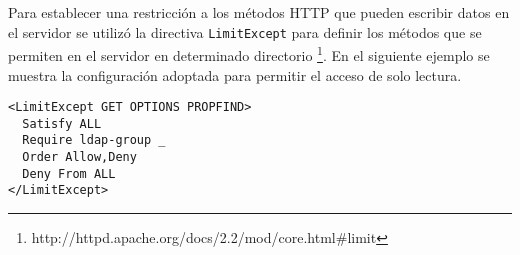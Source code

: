 {
 \linespread{1}
 \begin{table}[H]
 \caption{Clasificaci\'{o}n de m\'{e}todos \textsc{HTTP} de acuerdo al acceso a los datos}{}
 \label{tab:http-methods}
 \noindent{} %
 \end{table}
}

Para establecer una restricci\'{o}n a los m\'{e}todos \textsc{HTTP} que pueden escribir datos en el servidor se utiliz\'{o} la directiva \texttt{LimitExcept} para definir los m\'{e}todos que se permiten en el servidor en determinado directorio \footnote{http://httpd.apache.org/docs/2.2/mod/core.html\#limit}. En el siguiente ejemplo se muestra la configuraci\'{o}n adoptada para permitir el acceso de solo lectura.

{
\scriptsize
\linespread{1}
\begin{verbatim}
<LimitExcept GET OPTIONS PROPFIND>
  Satisfy ALL
  Require ldap-group _
  Order Allow,Deny
  Deny From ALL
</LimitExcept>
\end{verbatim}
}

